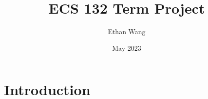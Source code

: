 \documentclass{article}
\title{ECS 132 Term Project}
\author{Ethan Wang}
\date{May 2023}
\begin{document}
\maketitle

\section{Introduction}
\end{document}
